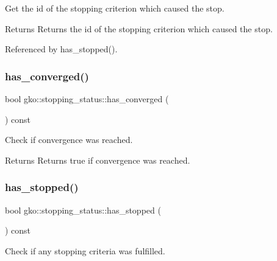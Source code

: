 Get the id of the stopping criterion which caused the stop. 

\begin{DoxyReturn}{Returns}
Returns the id of the stopping criterion which caused the stop. 
\end{DoxyReturn}


Referenced by has\+\_\+stopped().

\mbox{\label{classgko_1_1stopping__status_a825e74142fdaf17e9570d06db0b378db}} 
\subsubsection{\texorpdfstring{has\+\_\+converged()}{has\_converged()}}
{\footnotesize\ttfamily bool gko\+::stopping\+\_\+status\+::has\+\_\+converged (\begin{DoxyParamCaption}{ }\end{DoxyParamCaption}) const\hspace{0.3cm}{\ttfamily [noexcept]}}



Check if convergence was reached. 

\begin{DoxyReturn}{Returns}
Returns true if convergence was reached. 
\end{DoxyReturn}
\mbox{\label{classgko_1_1stopping__status_af374c7164dcf3adb27a15a669714abcc}} 
\subsubsection{\texorpdfstring{has\+\_\+stopped()}{has\_stopped()}}
{\footnotesize\ttfamily bool gko\+::stopping\+\_\+status\+::has\+\_\+stopped (\begin{DoxyParamCaption}{ }\end{DoxyParamCaption}) const\hspace{0.3cm}{\ttfamily [noexcept]}}



Check if any stopping criteria was fulfilled. 

